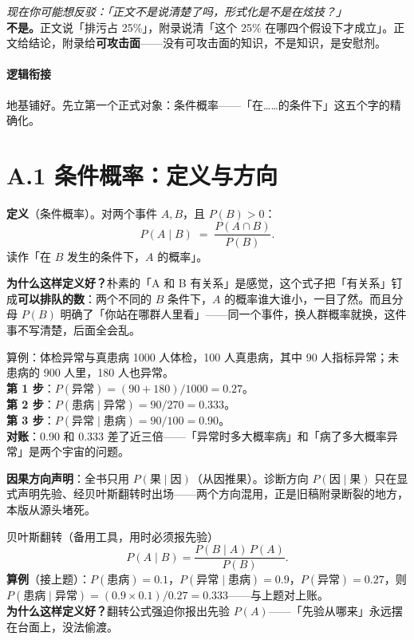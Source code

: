 \documentclass[../../main2.tex]{subfiles}
\begin{document}
\begin{questionbox}
	\textit{现在你可能想反驳：「正文不是说清楚了吗，形式化是不是在炫技？」}\\
	\textbf{不是。}正文说「排污占 25\%」，附录说清「这个 25\% 在哪四个假设下才成立」。正文给结论，附录给\textbf{可攻击面}——没有可攻击面的知识，不是知识，是安慰剂。
\end{questionbox}

\paragraph*{逻辑衔接}
	地基铺好。先立第一个正式对象：条件概率——「在……的条件下」这五个字的精确化。

\section{A.1 条件概率：定义与方向}
\label{app:condprob}

\begin{definitionbox}
	\textbf{定义}（条件概率）。对两个事件 $A, B$，且 $P(B) > 0$：
	\[
	P(A \mid B) \;=\; \frac{P(A \cap B)}{P(B)}.
	\]
	读作「在 $B$ 发生的条件下，$A$ 的概率」。
\end{definitionbox}

\textbf{为什么这样定义好？}朴素的「A 和 B 有关系」是感觉，这个式子把「有关系」钉成\textbf{可以排队的数}：两个不同的 $B$ 条件下，$A$ 的概率谁大谁小，一目了然。而且分母 $P(B)$ 明确了「你站在哪群人里看」——同一个事件，换人群概率就换，这件事不写清楚，后面全会乱。

\begin{mathbox}{算例：体检异常与真患病}
	1000 人体检，100 人真患病，其中 90 人指标异常；未患病的 900 人里，180 人也异常。\\
	\textbf{第 1 步}：$P(\text{异常}) = (90+180)/1000 = 0.27$。\\
	\textbf{第 2 步}：$P(\text{患病} \mid \text{异常}) = 90 / 270 = 0.333$。\\
	\textbf{第 3 步}：$P(\text{异常} \mid \text{患病}) = 90 / 100 = 0.90$。\\
	\textbf{对账}：0.90 和 0.333 差了近三倍——「异常时多大概率病」和「病了多大概率异常」是两个宇宙的问题。\end{mathbox}

\textbf{因果方向声明}：全书只用 $P(\text{果} \mid \text{因})$（从因推果）。诊断方向 $P(\text{因} \mid \text{果})$ 只在显式声明先验、经贝叶斯翻转时出场——两个方向混用，正是旧稿附录断裂的地方，本版从源头堵死。

\begin{mathbox}{贝叶斯翻转（备用工具，用时必须报先验）}
	\[
	P(A \mid B) = \frac{P(B \mid A)\, P(A)}{P(B)}.
	\]
	\textbf{算例}（接上题）：$P(\text{患病}) = 0.1$，$P(\text{异常} \mid \text{患病}) = 0.9$，$P(\text{异常}) = 0.27$，则
	$P(\text{患病} \mid \text{异常}) = (0.9 \times 0.1) / 0.27 = 0.333$——与上题对上账。\\
	\textbf{为什么这样定义好？}翻转公式强迫你报出先验 $P(A)$——「先验从哪来」永远摆在台面上，没法偷渡。
\end{mathbox}
\end{document}
